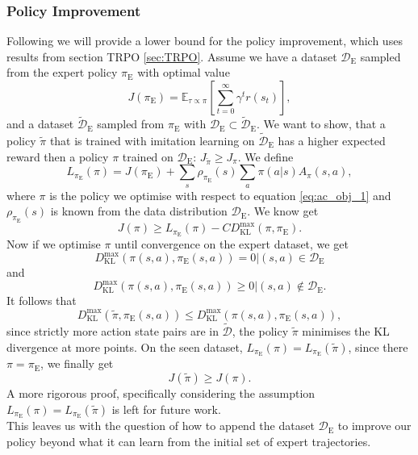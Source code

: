 \subsubsection{Policy Improvement}
Following we will provide a lower bound for the policy improvement, which uses results from section TRPO \ref{sec:TRPO}. 
Assume we have a dataset $\mathcal{D}_{\text{E}}$ sampled from the expert policy $\pi_{\text{E}}$ with optimal value 
$$J(\pi_{\text{E}}) =\mathbb{E}_{\tau \propto \pi}\left[\sum_{t=0}^{\infty}  \gamma^t r(s_t) \right],$$
and a dataset $\tilde{\mathcal{D}}_{\text{E}}$ sampled from $\pi_{\text{E}}$ with $\mathcal{D}_{\text{E}} \subset \tilde{\mathcal{D}}_{\text{E}}$. 
We want to show, that a policy $\tilde{\pi}$ that is trained with imitation learning on $\tilde{\mathcal{D}}_{\text{E}}$ has 
a higher expected reward then a policy $\pi$ trained on $\mathcal{D}_{\text{E}}$: $J_{\tilde{\pi}} \geq J_{\pi}$.
We define 
$$L_{\pi_{\text{E}}}(\pi) = J(\pi_{\text{E}}) + \sum_s \rho_{\pi_{\text{E}}}(s) \sum_a \pi(a|s) A_{\pi}(s,a),$$
where $\pi$ is the policy we optimise with respect to equation \ref{eq:ac_obj_1} and $\rho_{\pi_{\text{E}}}(s)$ is known from 
the data distribution $\mathcal{D}_{\text{E}}$. We know get 
$$J({\pi}) \geq L_{\pi_{\text{E}}}({\pi}) - C D^{\max}_{\operatorname{KL}} (\pi,\pi_{\text{E}}).$$
Now if we optimise $\pi$ until convergence on the expert dataset, we get 
$$D^{\max}_{\operatorname{KL}}(\pi(s,a),\pi_{\text{E}}(s,a)) = 0 |(s,a) \in \mathcal{D}_{\text{E}}$$
and 
$$D^{\max}_{\operatorname{KL}}(\pi(s,a),\pi_{\text{E}}(s,a)) \geq 0 |(s,a) \notin \mathcal{D}_{\text{E}}.$$
It follows that 
$$D^{\max}_{\operatorname{KL}}(\tilde{\pi},\pi_{\text{E}}(s,a)) \leq D^{\max}_{\operatorname{KL}}(\pi(s,a),\pi_{\text{E}}(s,a)),$$
since strictly more action state pairs are in $\tilde{\mathcal{D}}$, the policy $\tilde{\pi}$ minimises the KL divergence at more points.
On the seen dataset, $L_{\pi_{\text{E}}}({\pi}) = L_{\pi_{\text{E}}}({\tilde{\pi}})$, since there $\pi = \pi_{\text{E}}$, we finally get 
\begin{equation}
    J(\tilde{\pi}) \geq J({\pi}).
\end{equation}
A more rigorous proof, specifically considering the assumption $L_{\pi_{\text{E}}}({\pi}) = L_{\pi_{\text{E}}}({\tilde{\pi}})$ is left for future work.\\

This leaves us with the question of how to append the dataset $\mathcal{D}_{\text{E}}$ to improve our policy beyond what it can learn from the 
initial set of expert trajectories.\\

